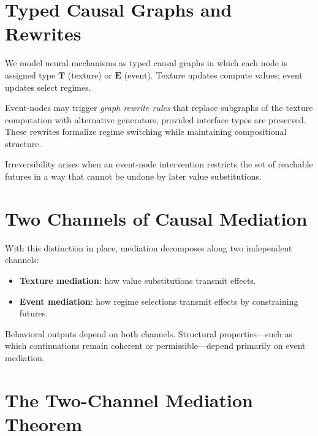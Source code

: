 \documentclass[11pt]{article}
\theoremstyle{remark}
\begin{document}
\section{Typed Causal Graphs and Rewrites}

We model neural mechanisms as typed causal graphs in which each node is assigned type $\mathbf{T}$ (texture) or $\mathbf{E}$ (event). Texture updates compute values; event updates select regimes.

Event-nodes may trigger \emph{graph rewrite rules} that replace subgraphs of the texture computation with alternative generators, provided interface types are preserved. These rewrites formalize regime switching while maintaining compositional structure.

Irreversibility arises when an event-node intervention restricts the set of reachable futures in a way that cannot be undone by later value substitutions.

\section{Two Channels of Causal Mediation}

With this distinction in place, mediation decomposes along two independent channels:

\begin{itemize}
\item \textbf{Texture mediation}: how value substitutions transmit effects.
\item \textbf{Event mediation}: how regime selections transmit effects by constraining futures.
\end{itemize}

Behavioral outputs depend on both channels. Structural properties—such as which continuations remain coherent or permissible—depend primarily on event mediation.

\section{The Two-Channel Mediation Theorem}
\end{document}
